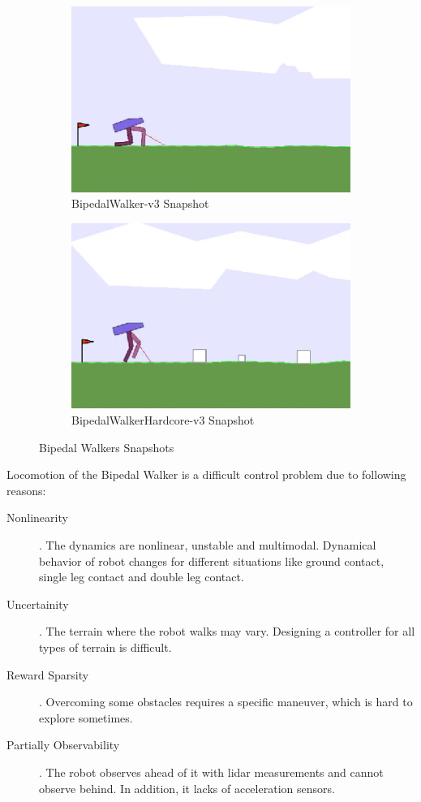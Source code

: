 \begin{figure}
	\begin{subfigure}{.5\textwidth}
		\centering
		\includegraphics[width=0.9\linewidth]{figures/bipedal/classic.png}
		\caption{BipedalWalker-v3 Snapshot}
		\label{fig:bipedal_walker_classic}
	\end{subfigure}
	\begin{subfigure}{.5\textwidth}
		\centering
		\includegraphics[width=0.9\linewidth]{figures/bipedal/hardcore.png}
		\caption{BipedalWalkerHardcore-v3 Snapshot}
		\label{fig:bipedal_walker_hardcore}
	\end{subfigure}
	\caption{Bipedal Walkers Snapshots}
	\label{fig:bipedal_walkers}
\end{figure}

Locomotion of the Bipedal Walker is a difficult control problem due to following reasons: 
\begin{description}
	\item[Nonlinearity]. The dynamics are nonlinear, unstable and multimodal. 
	Dynamical behavior of robot changes for different situations 
	like ground contact, single leg contact and double leg contact.
	\item[Uncertainity]. The terrain where the robot walks may vary. 
	Designing a controller for all types of terrain is difficult.
	\item[Reward Sparsity]. Overcoming some obstacles requires a specific maneuver, which is hard to explore sometimes.	
	\item[Partially Observability]. The robot observes 
	ahead of it with lidar measurements and cannot observe behind. 
	In addition, it lacks of acceleration sensors.
\end{description}

